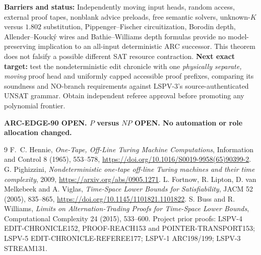 \documentclass[11pt]{article}
\begin{document}
\textbf{Barriers and status:} Independently moving input heads, random access, external proof tapes, nonblank advice preloads, free semantic solvers, unknown-$K$ versus $1.802$ substitution, Pippenger--Fischer circuitization, Borodin depth, Allender--Kouck\'y wires and Bathie--Williams depth formulas provide no model-preserving implication to an all-input deterministic ARC successor. This theorem does not falsify a possible different SAT resource contraction. \textbf{Next exact target:} test the nondeterministic edit chronicle with one \emph{physically separate, moving} proof head and uniformly capped accessible proof prefixes, comparing its soundness and NO-branch requirements against LSPV-3's source-authenticated UNSAT grammar. Obtain independent referee approval before promoting any polynomial frontier.

\noindent\textbf{ARC-EDGE-90 OPEN. $P$ versus $NP$ OPEN. No automation or role allocation changed.}

\begin{thebibliography}{9}
 F.~C. Hennie, \emph{One-Tape, Off-Line Turing Machine Computations}, Information and Control 8 (1965), 553--578, \url{https://doi.org/10.1016/S0019-9958(65)90399-2}.
 G. Pighizzini, \emph{Nondeterministic one-tape off-line Turing machines and their time complexity}, 2009, \url{https://arxiv.org/abs/0905.1271}.
 L. Fortnow, R. Lipton, D. van Melkebeek and A. Viglas, \emph{Time-Space Lower Bounds for Satisfiability}, JACM 52 (2005), 835--865, \url{https://doi.org/10.1145/1101821.1101822}.
 S. Buss and R. Williams, \emph{Limits on Alternation-Trading Proofs for Time-Space Lower Bounds}, Computational Complexity 24 (2015), 533--600.
 Project prior proofs: LSPV-4 EDIT-CHRONICLE152, PROOF-REACH153 and POINTER-TRANSPORT153; LSPV-5 EDIT-CHRONICLE-REFEREE177; LSPV-1 ARC198/199; LSPV-3 STREAM131.
\end{thebibliography}
\end{document}

